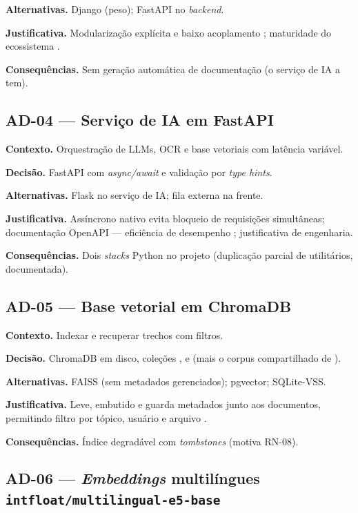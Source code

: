 \textbf{Alternativas.} Django (peso); FastAPI no \emph{backend}.

\textbf{Justificativa.} Modularização explícita e baixo acoplamento \cite{sommerville_2015}; maturidade do ecossistema \cite{pressman_maxim_2014}.

\textbf{Consequências.} Sem geração automática de documentação (o serviço de IA a tem).

\subsection{AD-04 --- Serviço de IA em FastAPI}

\textbf{Contexto.} Orquestração de LLMs, OCR e base vetoriais com latência variável.

\textbf{Decisão.} FastAPI com \emph{async/await} e validação por \emph{type hints}.

\textbf{Alternativas.} Flask no serviço de IA; fila externa na frente.

\textbf{Justificativa.} Assíncrono nativo evita bloqueio de requisições simultâneas; documentação OpenAPI --- eficiência de desempenho \cite{iso_25010}; justificativa de engenharia.

\textbf{Consequências.} Dois \emph{stacks} Python no projeto (duplicação parcial de utilitários, documentada).

\subsection{AD-05 --- Base vetorial em ChromaDB}

\textbf{Contexto.} Indexar e recuperar trechos com filtros.

\textbf{Decisão.} ChromaDB em disco, coleções \texttt{}, \texttt{} e \texttt{} (mais o corpus compartilhado de \texttt{}).

\textbf{Alternativas.} FAISS (sem metadados gerenciados); pgvector; SQLite-VSS.

\textbf{Justificativa.} Leve, embutido e guarda metadados junto aos documentos, permitindo filtro por tópico, usuário e arquivo \cite{chromadb_2025}.

\textbf{Consequências.} Índice degradável com \emph{tombstones} (motiva RN-08).

\subsection{AD-06 --- \emph{Embeddings} multilíngues \texttt{intfloat/multi\allowbreak lingual-e5-base}}


